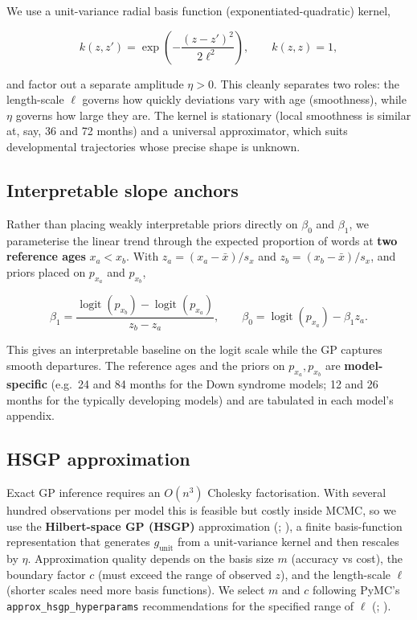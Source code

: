 \documentclass[
  11pt,
  a4paper,
]{report}
\begin{document}
We use a unit-variance radial basis function (exponentiated-quadratic)
kernel,

\[
k(z,z') = \exp\!\left(-\frac{(z-z')^2}{2\ell^2}\right),
\qquad k(z,z) = 1,
\]

and factor out a separate amplitude \(\eta > 0\). This cleanly separates
two roles: the length-scale \(\ell\) governs how quickly deviations vary
with age (smoothness), while \(\eta\) governs how large they are. The
kernel is stationary (local smoothness is similar at, say, 36 and 72
months) and a universal approximator, which suits developmental
trajectories whose precise shape is unknown.

\subsection{Interpretable slope anchors}\label{sec-anchors}

Rather than placing weakly interpretable priors directly on \(\beta_0\)
and \(\beta_1\), we parameterise the linear trend through the expected
proportion of words at \textbf{two reference ages} \(x_a < x_b\). With
\(z_a = (x_a - \bar{x})/s_x\) and \(z_b = (x_b - \bar{x})/s_x\), and
priors placed on \(p_{x_a}\) and \(p_{x_b}\),

\[
\beta_1 = \frac{\operatorname{logit}(p_{x_b}) - \operatorname{logit}(p_{x_a})}{z_b - z_a},
\qquad
\beta_0 = \operatorname{logit}(p_{x_a}) - \beta_1 z_a .
\]

This gives an interpretable baseline on the logit scale while the GP
captures smooth departures. The reference ages and the priors on
\(p_{x_a}, p_{x_b}\) are \textbf{model-specific} (e.g.~24 and 84 months
for the Down syndrome models; 12 and 26 months for the typically
developing models) and are tabulated in each model's appendix.

\subsection{HSGP approximation}\label{sec-hsgp}

Exact GP inference requires an \(O(n^3)\) Cholesky factorisation. With
several hundred observations per model this is feasible but costly
inside MCMC, so we use the \textbf{Hilbert-space GP (HSGP)}
approximation
(; ), a finite basis-function representation that generates
\(g_{\mathrm{unit}}\) from a unit-variance kernel and then rescales by
\(\eta\). Approximation quality depends on the basis size \(m\)
(accuracy vs cost), the boundary factor \(c\) (must exceed the range of
observed \(z\)), and the length-scale \(\ell\) (shorter scales need more
basis functions). We select \(m\) and \(c\) following PyMC's
\texttt{approx\_hsgp\_hyperparams} recommendations for the specified
range of \(\ell\)
(;
).
\end{document}
